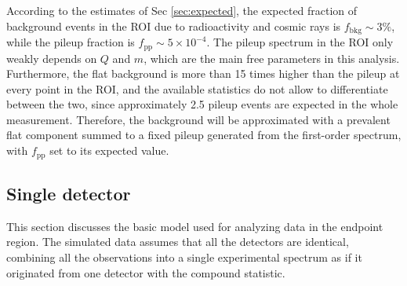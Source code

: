 According to the estimates of Sec \ref{sec:expected}, the expected fraction of background events in the ROI
due to radioactivity and cosmic rays is $f_{\text{bkg}}\sim 3\%$, while the pileup fraction is $f_{\text{pp}}\sim
5\times 10^{-4}$. The pileup spectrum in the ROI only weakly depends on $Q$ and $m$, which are the main free parameters
in this analysis. Furthermore, the flat background is more than 15 times higher than the pileup at every point in the
ROI, and the available statistics do not allow to differentiate between the two, since approximately 2.5 pileup events
are expected in the whole measurement. Therefore, the background will be approximated with a prevalent flat component
summed to a fixed pileup generated from the first-order spectrum, with $f_{\text{pp}}$ set to its expected value.

\subsection{Single detector}

This section discusses the basic model used for analyzing data in the endpoint region. The simulated data assumes that
all the detectors are identical, combining all the observations into a single experimental spectrum as if it originated
from one detector with the compound statistic. 


